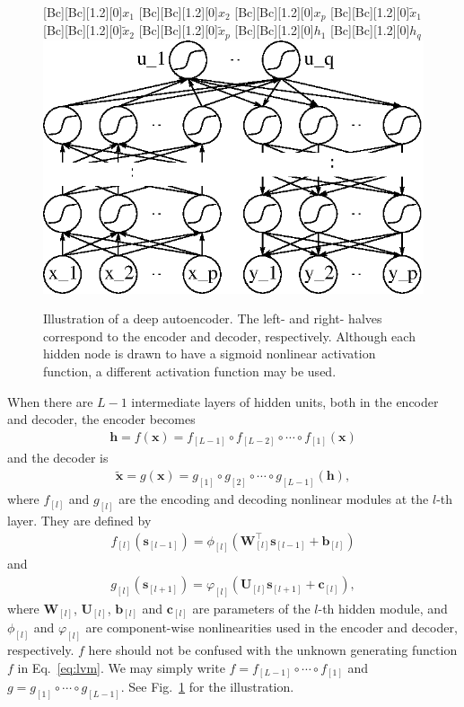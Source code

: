\documentclass[dissertation,nocontribution,draft*]{aaltoseries}
\newcommand{\qlay}[1]{\left[#1\right]}
\newcommand{\vect}[1]{\mathbf{#1}}
\newcommand{\matr}[1]{\mathbf{#1}}
\newcommand{\vb}[0]{\vect{b}}
\newcommand{\vc}[0]{\vect{c}}
\newcommand{\vh}[0]{\vect{h}}
\newcommand{\vx}[0]{\vect{x}}
\newcommand{\vs}[0]{\vect{s}}
\newcommand{\mW}[0]{\matr{W}}
\newcommand{\mU}[0]{\matr{U}}
\begin{document}
\begin{figure}[t]
    \centering
    [Bc][Bc][1.2][0]{$x_1$}
    [Bc][Bc][1.2][0]{$x_2$}
    [Bc][Bc][1.2][0]{$x_p$}
    [Bc][Bc][1.2][0]{$\tilde{x}_1$}
    [Bc][Bc][1.2][0]{$\tilde{x}_2$}
    [Bc][Bc][1.2][0]{$\tilde{x}_p$}
    [Bc][Bc][1.2][0]{$h_1$}
    [Bc][Bc][1.2][0]{$h_q$}
    \includegraphics[width=0.75\columnwidth]{figures/deepae.eps}
    \caption{Illustration of a deep autoencoder. The
    left- and right- halves correspond to the encoder and
    decoder, respectively. Although each hidden node is
    drawn to have a sigmoid nonlinear activation function,
    a different activation function may be used.}
    \label{fig:dae}
\end{figure}

When there are $L-1$ intermediate layers of hidden units,
both in the encoder and decoder, the encoder becomes
\begin{align}
    \label{eq:ae_encoder}
    \vh = f(\vx) = f_{
    \qlay{L-1}} \circ f_{\qlay{L-2}} \circ \cdots \circ
    f_{\qlay{1}}(\vx)
\end{align}
and the decoder is
\begin{align}
    \label{eq:ae_decoder}
    \tilde{\vx} = g(\vx) = g_{\qlay{1}} \circ g_{\qlay{2}} \circ \cdots \circ
    g_{\qlay{L-1}} (\vh),
\end{align}
where $f_{\qlay{l}}$ and $g_{\qlay{l}}$ are the encoding and decoding
nonlinear modules at the $l$-th layer. They are
defined by
\begin{align*}
    f_{\qlay{l}}(\vs_{\qlay{l-1}}) = \phi_{\qlay{l}}
    \left(\mW_{\qlay{l}}^\top \vs_{\qlay{l-1}} +
    \vb_{\qlay{l}}\right)
\end{align*}
and
\begin{align*}
    g_{\qlay{l}}(\vs_{\qlay{l+1}}) = \varphi_{\qlay{l}}
    \left(\mU_{\qlay{l}} \vs_{\qlay{l+1}} + \vc_{\qlay{l}}
    \right),
\end{align*}
where $\mW_{\qlay{l}}$, $\mU_{\qlay{l}}$, $\vb_{\qlay{l}}$
and $\vc_{\qlay{l}}$ are parameters
of the $l$-th hidden module, and $\phi_{\qlay{l}}$ and
$\varphi_{\qlay{l}}$
are component-wise nonlinearities used in the encoder and
decoder, respectively.  $f$ here should not be confused with
the unknown generating function $f$ in Eq.~\eqref{eq:lvm}.
We may simply write $f = f_{\qlay{L-1}} \circ \cdots \circ
f_{\qlay{1}}$ and
$g = g_{\qlay{1}} \circ \cdots \circ g_{\qlay{L-1}}$. See Fig.~\ref{fig:dae}
for the illustration.
\end{document}
